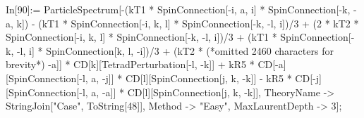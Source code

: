 In[90]:= ParticleSpectrum[-(kT1 * SpinConnection[-i, a, i] * SpinConnection[-k, -a, k]) - (kT1 * SpinConnection[-i, k, l] * SpinConnection[-k, -l, i])/3 + (2 * kT2 * SpinConnection[-i, k, l] * SpinConnection[-k, -l, i])/3 + (kT1 * SpinConnection[-k, -l, i] * SpinConnection[k, l, -i])/3 + (kT2 * (*omitted 2460 characters for brevity*) -a]] * CD[k][TetradPerturbation[-l, -k]] + kR5 * CD[-a][SpinConnection[-l, a, -j]] * CD[l][SpinConnection[j, k, -k]] - kR5 * CD[-j][SpinConnection[-l, a, -a]] * CD[l][SpinConnection[j, k, -k]], TheoryName -> StringJoin["Case", ToString[48]], Method -> "Easy", MaxLaurentDepth -> 3];